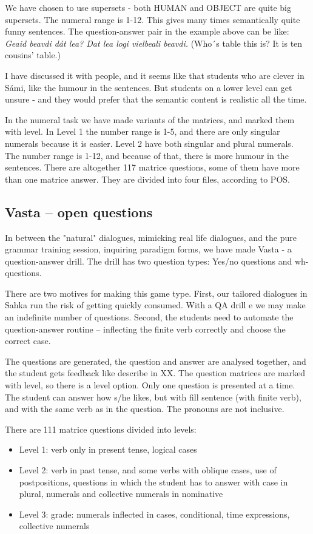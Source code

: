 \documentclass[a4paper,12pt]{article}
\begin{document}
We have chosen to use supersets - both HUMAN and OBJECT are quite big supersets. The numeral range is 1-12. This gives many times semantically quite funny sentences. The question-answer pair in the example above can be like: \textit{Geaid beavdi dát lea? Dat lea logi vielbeali beavdi.} (Who´s table this is? It is ten cousins’ table.) 

I have discussed it with people, and it seems like that students who are clever in Sámi, like the humour in the sentences. But students on a lower level can get unsure - and they would prefer that the semantic content is realistic all the time.   

In the numeral task we have made variants of the matrices, and marked them with level. In Level 1 the number range is 1-5, and there are only singular numerals because it is easier. Level 2 have both singular and plural numerals. The number range is 1-12, and because of that, there is more humour in the sentences. There are altogether 117 matrice questions, some of them have more than one matrice answer. They are divided into four files, according to POS.




\subsection{Vasta -- open questions}	

In between the "natural" dialogues, mimicking real life dialogues, and the pure grammar training session, inquiring paradigm forms, we have made Vasta - a question-answer drill. The drill has two question types: Yes/no questions and wh-questions. 

There are two motives for making this game type. First, our tailored dialogues in Sahka run the risk of getting quickly consumed. With a QA drill e we may make an indefinite number of questions. Second, the students need to automate the question-answer routine -- inflecting the finite verb correctly and choose the correct case.

The questions are generated, the question and answer are analysed together, and the student gets feedback like describe in XX. The question matrices are marked with level, so there is a level option. Only one question is presented at a time. The student can answer how s/he likes, but with fill sentence (with finite verb), and with the same verb as in the question. The pronouns are not inclusive.

There are 111 matrice questions divided into levels:
\begin{itemize}
\item Level 1: verb only in present tense, logical cases
\item  Level 2: verb in past tense, and some verbs with oblique cases, use of postpositions, questions in which the student has to answer with case in plural,  numerals and collective numerals in nominative
\item  Level 3: grade: numerals inflected in cases, conditional, time expressions, collective numerals
\end{itemize}
\vspace{0.5cm}
\end{document}
